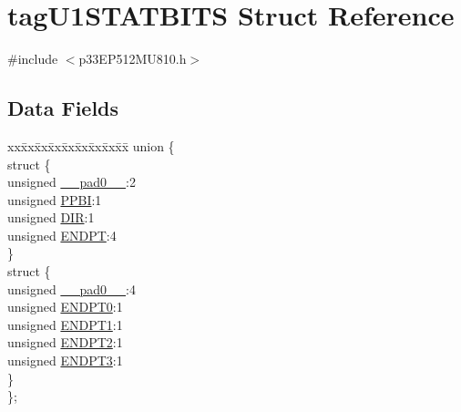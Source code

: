 \hypertarget{structtag_u1_s_t_a_t_b_i_t_s}{}\section{tag\+U1\+S\+T\+A\+T\+B\+I\+TS Struct Reference}
\label{structtag_u1_s_t_a_t_b_i_t_s}


{\ttfamily \#include $<$p33\+E\+P512\+M\+U810.\+h$>$}

\subsection*{Data Fields}
\begin{DoxyCompactItemize}
\item 
\begin{tabbing}
xx\=xx\=xx\=xx\=xx\=xx\=xx\=xx\=xx\=\kill
union \{\\
\>struct \{\\
\>\>unsigned \hyperlink{structtag_u1_s_t_a_t_b_i_t_s_adf71f3d8410c1f1dbbc96680a92c49af}{\_\_pad0\_\_}:2\\
\>\>unsigned \hyperlink{structtag_u1_s_t_a_t_b_i_t_s_a3a32c5a0c64fb0ccf11eba639ed65501}{PPBI}:1\\
\>\>unsigned \hyperlink{structtag_u1_s_t_a_t_b_i_t_s_ad6868749602045a76f36ffdf964dfd39}{DIR}:1\\
\>\>unsigned \hyperlink{structtag_u1_s_t_a_t_b_i_t_s_a16fe872ae957cb61c8f8124f5ce3c473}{ENDPT}:4\\
\>\} \\
\>struct \{\\
\>\>unsigned \hyperlink{structtag_u1_s_t_a_t_b_i_t_s_adf71f3d8410c1f1dbbc96680a92c49af}{\_\_pad0\_\_}:4\\
\>\>unsigned \hyperlink{structtag_u1_s_t_a_t_b_i_t_s_a6785f5b732cc823494d31e570fbde276}{ENDPT0}:1\\
\>\>unsigned \hyperlink{structtag_u1_s_t_a_t_b_i_t_s_a5bb146e061d7dcf67b404fb3a0fd202f}{ENDPT1}:1\\
\>\>unsigned \hyperlink{structtag_u1_s_t_a_t_b_i_t_s_a7a375ce5226a5734c10f9c26f44ed35d}{ENDPT2}:1\\
\>\>unsigned \hyperlink{structtag_u1_s_t_a_t_b_i_t_s_abae74c9c182706488bdd4a874c489aa7}{ENDPT3}:1\\
\>\} \\
\}; \\

\end{tabbing}\end{DoxyCompactItemize}


